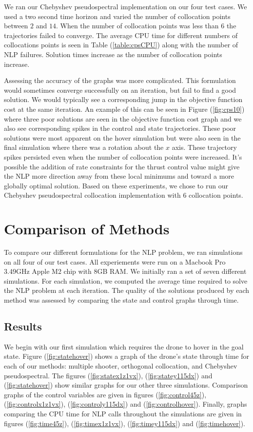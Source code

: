 \documentclass[]{article}
\begin{document}
	We ran our Chebyshev pseudospectral implementation on our four test cases. We used a two second time horizon and varied the number of collocation points between $2$ and $14$.  When the number of collocation points was less than $6$ the trajectories failed to converge. The average CPU time for different numbers of collocations points is seen in Table (\ref{table:cpsCPU}) along with the number of NLP failures.	Solution times increase as the number of collocation points increase.  
	
	Assessing the accuracy of the graphs was more complicated.  This formulation would sometimes converge successfully on an iteration, but fail to find a good solution.  We would typically see a corresponding jump in the objective function cost at the same iteration. An example of this can be seen in Figure (\ref{fig:cps10}) where three poor solutions are seen in the objective function cost graph and we also see  corresponding spikes in the control and  state trajectories.  These poor solutions were most apparent on the hover simulation but were also seen in the final simulation where there was a rotation about the $x$ axis.  These trajectory spikes persisted even when the number of collocation points were increased.  It's possible the addition of rate constraints for the thrust control value might give the NLP more direction away from these local minimums and toward a more globally optimal solution. Based on these experiments, we chose to run our Chebyshev pseudospectral collocation implementation with $6$ collocation points.
	
\section*{Comparison of Methods}

To compare our different formulations for the NLP problem, we ran simulations on all four of our test cases.  All experiements were run on a Macbook Pro  3.49GHz Apple M2 chip with 8GB RAM. We initially ran a set of seven different simulations.  For each simulation, we computed the average time required to solve the NLP problem at each iteration. The quality of the solutions produced by each method was assessed by comparing the state and control graphs through time. 


\subsection*{Results}
We begin with our first simulation which requires the drone to hover in the goal state. 
Figure (\ref{fig:statehover}) shows a graph of the drone's state through time for each of our methods:  multiple shooter, orthogonal collocation, and Chebyshev pseudospectral. The figures  (\ref{fig:statex1z1vx}), (\ref{fig:statey115dx}) and (\ref{fig:statehover}) show similar graphs for our other three simulations.  Comparison graphs of the control variables are given in figures (\ref{fig:control45z}), (\ref{fig:controlx1z1vx}), (\ref{fig:controly115dx}) and (\ref{fig:controlhover}). Finally, graphs comparing the CPU time for NLP calls throughout the simulations are given in figures (\ref{fig:time45z}), (\ref{fig:timex1z1vx}), (\ref{fig:timey115dx}) and (\ref{fig:timehover}). 
 
\end{document}
